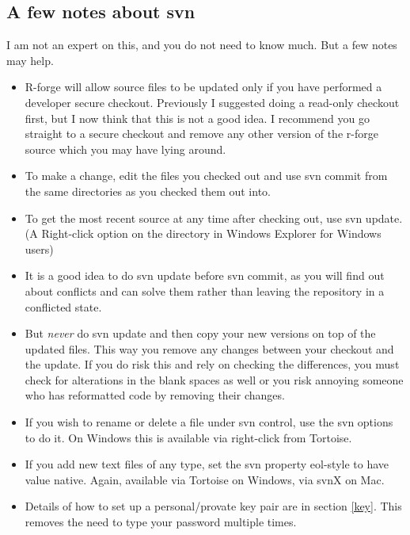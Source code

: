 \documentclass[12pt, a4paper]{article}
\renewcommand{\=}{\,=\,}
\newcommand{\+}{\,+\,}
\begin{document}
\subsection{A few notes about svn}
I am not an expert on this, and you do not need to know much. But a few notes
may help.
\begin{itemize}
\item R-forge will allow source files to be updated only if you have performed a
  developer secure checkout. Previously I suggested doing a read-only checkout
  first, but I now think that this is not a good idea. I recommend you go
  straight to a secure checkout and remove any other version of the r-forge
  source which you may have lying around.
 \item To make a change, edit the files you checked out and use \textsf{svn
     commit} from the same directories as you checked them out into.
 \item To get the most recent source at any time after checking out, use
   \textsf{svn update}. (A Right-click option on the directory in Windows
   Explorer for Windows users)
\item It is a good idea to do \textsf{svn update} before \textsf{svn commit}, as
  you will find out about conflicts and can solve them rather than leaving the
  repository in a conflicted state.
\item But \emph{never} do \textsf{svn update} and then copy your new versions on
  top of the updated files. This way you remove any changes between your
  checkout and the update. If you do risk this and rely on checking the
  differences, you must check for alterations in the blank spaces as well or you
  risk annoying someone who has reformatted code by removing their changes.
\item If you wish to rename or delete a file under svn control, use the svn
  options to do it. On Windows this is available via right-click from Tortoise.
\item If you add new text files of any type, set the svn property
  \textsf{eol-style} to have value \textsf{native}.  Again, available via
  Tortoise on Windows, via svnX on Mac.
\item Details of how to set up a personal/provate key pair are in section
  \ref{key}. This removes the need to type your password multiple times.
\end{itemize}
\end{document}
